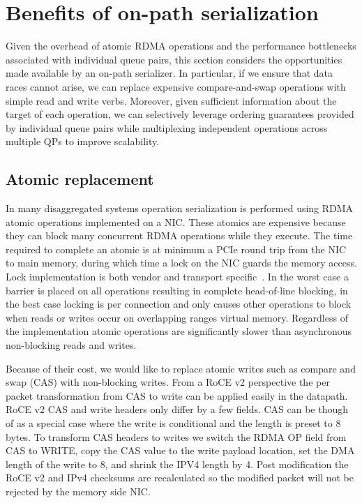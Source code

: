 \section{Benefits of on-path serialization}

Given the overhead of atomic RDMA operations and the performance
bottlenecks associated with individual queue pairs, this section
considers the opportunities made available by an on-path serializer.
In particular, if we ensure that data races cannot arise, we can
replace expensive compare-and-swap operations with simple read and
write verbs.  Moreover, given sufficient information about the target
of each operation, we can selectively leverage ordering guarantees
provided by individual queue pairs while multiplexing independent
operations across multiple QPs to improve scalability.

\subsection{Atomic replacement} 



In many disaggregated systems operation serialization is performed using RDMA
atomic operations implemented on a NIC. These atomics are expensive because they
can block many concurrent RDMA operations while they execute. The time required
to complete an atomic is at minimum a PCIe round trip from the NIC to main
memory, during which time a lock on the NIC guards the memory access. Lock
implementation is both vendor and transport specific~\cite{design-guidelines}.
In the worst case a barrier is placed on all operations resulting in complete
head-of-line blocking, in the best case locking is per connection and only
causes other operations to block when reads or writes occur on overlapping
ranges virtual memory. Regardless of the implementation atomic operations are
significantly slower than asynchronous non-blocking reads and writes.

Because of their cost, we would like to replace atomic writes such as compare
and swap (CAS) with non-blocking writes.  From a RoCE v2 perspective the per
packet transformation from CAS to write can be applied easily in the datapath.
RoCE v2 CAS and write headers only differ by a few fields. CAS can be though of
as a special case where the write is conditional and the length is preset to 8
bytes.
To transform CAS headers to writes we switch the RDMA OP field from CAS to
WRITE, copy the CAS value to the write payload location, set the DMA length of
the write to 8, and shrink the IPV4 length by 4. Post modification the RoCE v2
and IPv4 checksums are recalculated so the modified packet will not be rejected
by the memory side NIC.

